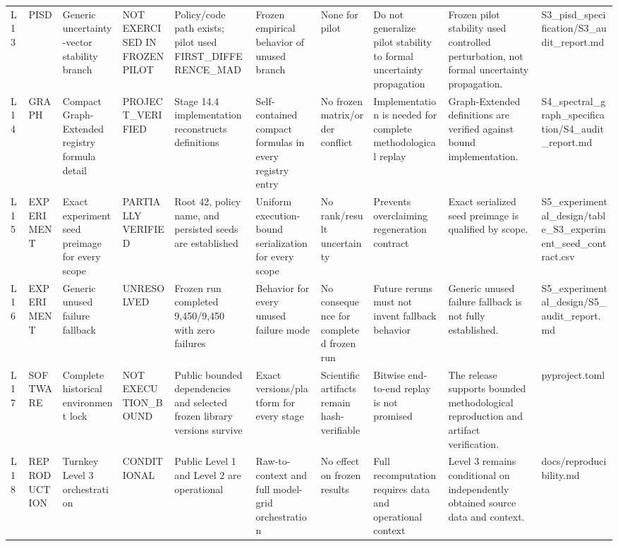 \begin{longtable}{llllllllll}
L13 & PISD & Generic uncertainty-vector stability branch & NOT EXERCISED IN FROZEN PILOT & Policy/code path exists; pilot used FIRST\_DIFFERENCE\_MAD & Frozen empirical behavior of unused branch & None for pilot & Do not generalize pilot stability to formal uncertainty propagation & Frozen pilot stability used controlled perturbation, not formal uncertainty propagation. & S3\_pisd\_specification/S3\_audit\_report.md \\
L14 & GRAPH & Compact Graph-Extended registry formula detail & PROJECT\_VERIFIED & Stage 14.4 implementation reconstructs definitions & Self-contained compact formulas in every registry entry & No frozen matrix/order conflict & Implementation is needed for complete methodological replay & Graph-Extended definitions are verified against bound implementation. & S4\_spectral\_graph\_specification/S4\_audit\_report.md \\
L15 & EXPERIMENT & Exact experiment seed preimage for every scope & PARTIALLY VERIFIED & Root 42, policy name, and persisted seeds are established & Uniform execution-bound serialization for every scope & No rank/result uncertainty & Prevents overclaiming regeneration contract & Exact serialized seed preimage is qualified by scope. & S5\_experimental\_design/table\_S3\_experiment\_seed\_contract.csv \\
L16 & EXPERIMENT & Generic unused failure fallback & UNRESOLVED & Frozen run completed 9,450/9,450 with zero failures & Behavior for every unused failure mode & No consequence for completed frozen run & Future reruns must not invent fallback behavior & Generic unused failure fallback is not fully established. & S5\_experimental\_design/S5\_audit\_report.md \\
L17 & SOFTWARE & Complete historical environment lock & NOT EXECUTION\_BOUND & Public bounded dependencies and selected frozen library versions survive & Exact versions/platform for every stage & Scientific artifacts remain hash-verifiable & Bitwise end-to-end replay is not promised & The release supports bounded methodological reproduction and artifact verification. & pyproject.toml \\
L18 & REPRODUCTION & Turnkey Level 3 orchestration & CONDITIONAL & Public Level 1 and Level 2 are operational & Raw-to-context and full model-grid orchestration & No effect on frozen results & Full recomputation requires data and operational context & Level 3 remains conditional on independently obtained source data and context. & docs/reproducibility.md \\

\end{longtable}
